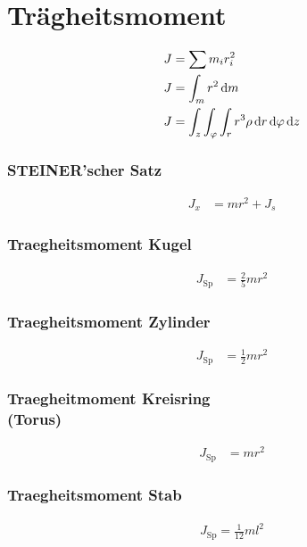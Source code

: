 \newpage
\section{Trägheitsmoment}


\begin{align*}
J&=\sum m_i r_i^2\\
J&=\int_m r^2 \mathop{}\!\mathrm{d} m \\
J&=\int_z\int_\varphi\int_r r^3\rho \mathop{}\!\mathrm{d} r \mathop{}\!\mathrm{d} \varphi \mathop{}\!\mathrm{d} z 
\end{align*}

\begin{multicols}{2}{}
\subsubsection{STEINER'scher Satz}
\begin{align*}
J_x&=mr^2+J_s
\end{align*}

\subsubsection{Traegheitsmoment Kugel}
\begin{align*}
J_\text{Sp}&=\frac{2}{5}mr^2
\end{align*}


\subsubsection{Traegheitsmoment Zylinder}
\begin{align*}
J_\text{Sp}&=\frac{1}{2}mr^2
\end{align*}


\subsubsection{Traegheitmoment Kreisring \\(Torus)}
\begin{align*}
J_\text{Sp}&=mr^2
\end{align*}


\subsubsection{Traegheitsmoment Stab}
\begin{align*}
J_\text{Sp}=\frac{1}{12}ml^2
\end{align*}
\end{multicols}


